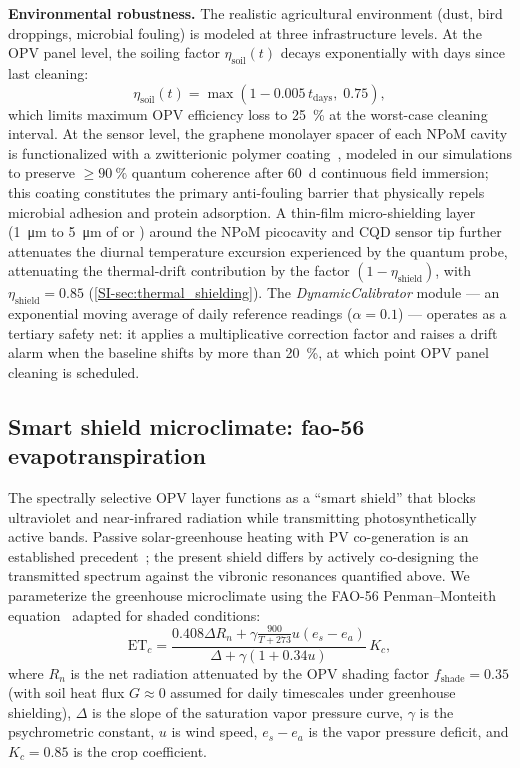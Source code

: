 \documentclass[preprint,12pt]{elsarticle}
\begin{document}
\textbf{Environmental robustness.}
The realistic agricultural environment (dust, bird droppings, microbial fouling) is modeled at three infrastructure levels.
At the OPV panel level, the soiling factor $\eta_{\mathrm{soil}}(t)$ decays exponentially with days since last cleaning:
\begin{equation}
  \eta_{\mathrm{soil}}(t) = \max\!\left(1 - 0.005\,t_{\mathrm{days}},\; 0.75\right),
  \label{eq:soiling}
\end{equation}
which limits maximum OPV efficiency loss to \qty{25}{\percent} at the worst-case cleaning interval.
At the sensor level, the graphene monolayer spacer of each NPoM cavity is functionalized with a zwitterionic polymer coating~\cite{Kumar2022,Do2025}, modeled in our simulations to preserve $\geq\qty{90}{\percent}$ quantum coherence after \qty{60}{\day} continuous field immersion; this coating constitutes the primary anti-fouling barrier that physically repels microbial adhesion and protein adsorption. A thin-film micro-shielding layer (\qty{1}{\micro\meter} to \qty{5}{\micro\meter} of  or ) around the NPoM picocavity and CQD sensor tip further attenuates the diurnal temperature excursion experienced by the quantum probe, attenuating the thermal-drift contribution by the factor $(1-\eta_{\mathrm{shield}})$, with $\eta_{\mathrm{shield}} = 0.85$ (\cref{SI-sec:thermal_shielding}). The \textit{DynamicCalibrator} module --- an exponential moving average of daily reference readings ($\alpha = 0.1$) --- operates as a tertiary safety net: it applies a multiplicative correction factor and raises a drift alarm when the baseline shifts by more than \qty{20}{\percent}, at which point OPV panel cleaning is scheduled.

\subsection*{Smart shield microclimate: fao-56 evapotranspiration}

The spectrally selective OPV layer functions as a ``smart shield'' that blocks ultraviolet and near-infrared radiation while transmitting photosynthetically active bands. Passive solar-greenhouse heating with PV co-generation is an established precedent~\cite{Wu2023Energies}; the present shield differs by actively co-designing the transmitted spectrum against the vibronic resonances quantified above.
We parameterize the greenhouse microclimate using the FAO-56 Penman--Monteith equation~\cite{Allen1998} adapted for shaded conditions:
\begin{equation}
\mathrm{ET}_c = \frac{0.408 \Delta R_n + \gamma \frac{900}{T+273} u (e_s - e_a)}{\Delta + \gamma(1 + 0.34 u)} \, K_c,
\label{eq:fao56}
\end{equation}
where $R_n$ is the net radiation attenuated by the OPV shading factor $f_{\mathrm{shade}} = 0.35$ (with soil heat flux $G \approx 0$ assumed for daily timescales under greenhouse shielding), $\Delta$ is the slope of the saturation vapor pressure curve, $\gamma$ is the psychrometric constant, $u$ is wind speed, $e_s - e_a$ is the vapor pressure deficit, and $K_c = 0.85$ is the crop coefficient.
\end{document}
